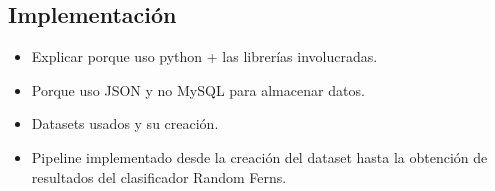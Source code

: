\subsection{Implementación}

	\begin{itemize}
		\item Explicar porque uso python + las librerías involucradas.
		\item Porque uso JSON y no MySQL para almacenar datos.
		\item Datasets usados y su creación.
		\item Pipeline implementado desde la creación del dataset hasta la obtención de resultados del clasificador Random Ferns.
	\end{itemize}


